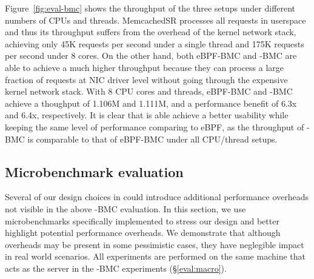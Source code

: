 Figure~\ref{fig:eval-bmc} shows the throughput of the three setups under
    different numbers of CPUs and threads.
MemcachedSR processes all requests in userspace and thus its throughput suffers
    from the overhead of the kernel network stack, achieving only 45K requests
    per second under a single thread and 175K requests per second under 8
    cores.
On the other hand, both eBPF-BMC and \projname{}-BMC are able to
    achieve a much higher throughput because they can process a large
    fraction of requests at NIC driver level without going through
    the expensive kernel network stack.
With 8 CPU cores and threads, eBPF-BMC and \projname{}-BMC achieve a thoughput
    of 1.106M and 1.111M, and a performance benefit of 6.3x and 6.4x,
    respectively.
It is clear that \projname{} is able achieve a better usability while
    keeping the same level of performance comparing to
    eBPF, as the throughput of \projname{}-BMC is comparable to that of
    eBPF-BMC under all CPU/thread setups.

\subsection{Microbenchmark evaluation}
Several of our design choices in
    \projname{} could introduce additional performance overheads
not visible in the above \projname{}-BMC evaluation.
In this section, we use microbenchmarks specifically implemented to stress our design and better highlight potential
    performance overheads. We demonstrate that although overheads may be
    present in some pessimistic cases, they have neglegible impact in real world scenarios.
All experiments are performed on the same machine that acts as the server in
    the \projname{}-BMC experiments (\S\ref{eval:macro}).

